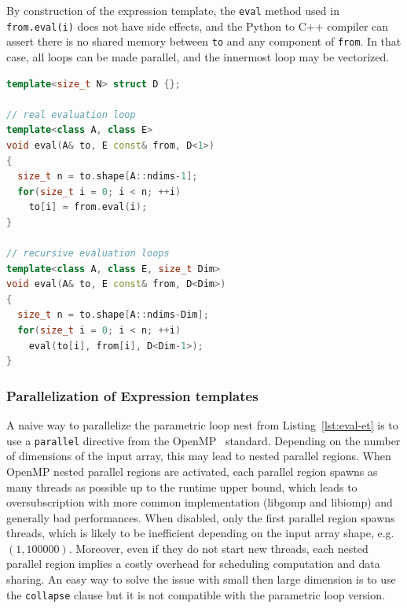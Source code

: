 \documentclass[10pt, preprint]{sigplanconf}
\begin{document}
By construction of the expression template, the \texttt{eval} method used in
\texttt{from.eval(i)} does not have side effects, and the Python to C++
compiler can assert there is no shared memory between \texttt{to} and any
component of \texttt{from}. In that case, all loops can be made parallel, and
the innermost loop may be vectorized.

\begin{lstlisting}[language=c++, label={lst:eval-et}, caption={Evaluation body of an expression template}]
template<size_t N> struct D {};

// real evaluation loop
template<class A, class E>
void eval(A& to, E const& from, D<1>)
{
  size_t n = to.shape[A::ndims-1];
  for(size_t i = 0; i < n; ++i)
    to[i] = from.eval(i);
}

// recursive evaluation loops
template<class A, class E, size_t Dim>
void eval(A& to, E const& from, D<Dim>)
{
  size_t n = to.shape[A::ndims-Dim];
  for(size_t i = 0; i < n; ++i)
    eval(to[i], from[i], D<Dim-1>);
}
\end{lstlisting}

\subsubsection{Parallelization of Expression templates}

A naive way to parallelize the parametric loop nest from
Listing~\ref{lst:eval-et} is to use a \texttt{parallel} directive from the
OpenMP~\cite{openmp4} standard. Depending on the number of dimensions of the
input array, this may lead to nested parallel regions. When OpenMP nested
parallel regions are activated, each parallel region spawns as many threads as
possible up to the runtime upper bound, which leads to oversubscription with
more common implementation (libgomp and libiomp) and generally bad performances. When
disabled, only the first parallel region spawns threads, which is likely to be
inefficient depending on the input array shape, e.g. $(1,100000)$. Moreover,
even if they do not start new threads, each nested parallel region implies a
costly overhead for scheduling computation and data sharing. An easy way to solve
the issue with small then large dimension is to use the \texttt{collapse}
clause but it is not compatible with the parametric loop version.
\end{document}
